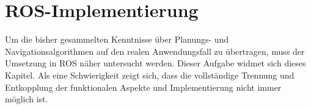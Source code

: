 \chapter{ROS-Implementierung}
Um die bisher gesammelten Kenntnisse über Planungs- und Navigationsalgorithmen auf den realen Anwendungsfall zu übertragen, muss der Umsetzung in ROS näher untersucht werden. Dieser Aufgabe widmet sich dieses Kapitel. Als eine Schwierigkeit zeigt sich, dass die vollständige Trennung und Entkopplung der funktionalen Aspekte und Implementierung nicht immer möglich ist. 


\newpage


\newpage


\newpage


\newpage

